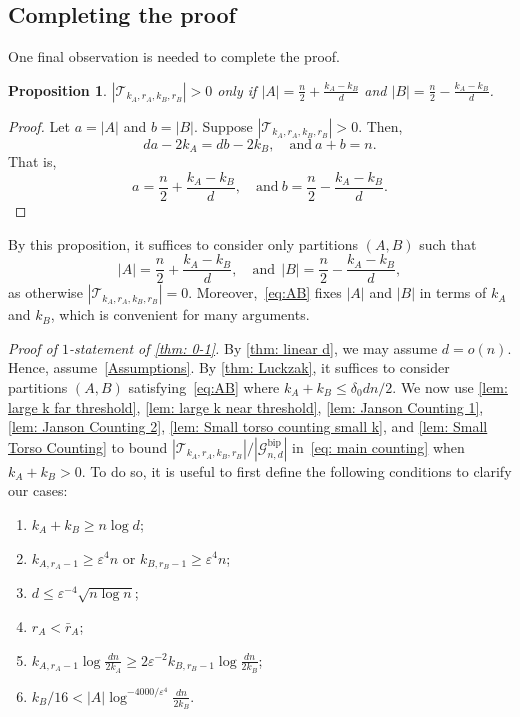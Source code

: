 \documentclass[11pt]{article}
\newcommand{\eps}{\varepsilon}
\theoremstyle{plain}
\newtheorem{prop}[thm]{Proposition}
\begin{document}
\subsection{Completing the proof}
One final observation is needed to complete the proof. 
\begin{prop}\label{prop: ab}
    $|\mathcal T_{k_A, r_A, k_B, r_B}| > 0$ only if $|A| = \frac{n}{2} + \frac{k_A-k_B}{d}$ and $|B| = \frac{n}{2} - \frac{k_A - k_B}{d}$.
\end{prop}
\begin{proof}
    Let $a=|A|$ and $b=|B|$.
    Suppose $|\mathcal T_{k_A, r_A, k_B, r_B}| > 0$. Then, 
    \[
        da - 2k_A = db - 2k_B,\quad \text{and}\         a + b = n.
    \]
    That is, 
    \[
    a = \frac{n}{2} + \frac{k_A - k_B}{d},\quad \text{and}\     b = \frac{n}{2} - \frac{k_A-k_B}{d}.
    \]
\end{proof}

By this proposition, it suffices to consider only partitions $(A,B)$ such that 
\begin{equation}
|A| = \frac{n}{2} + \frac{k_A-k_B}{d},\quad \text{and}\ \  |B| = \frac{n}{2} - \frac{k_A - k_B}{d},\label{eq:AB}
\end{equation}
as otherwise $|\mathcal T_{k_A, r_A, k_B, r_B}| = 0$.  Moreover,~\eqref{eq:AB} fixes $|A|$ and $|B|$ in terms of $k_A$ and $k_B$, which is convenient for many arguments. 

\medskip

\noindent \textit{Proof of $1$-statement of \cref{thm: 0-1}.} By \cref{thm: linear d}, we may assume $d = o(n)$. Hence, assume~\eqref{Assumptions}. By \cref{thm: Luckzak}, it suffices to consider partitions $(A,B)$ satisfying~\eqref{eq:AB} where $k_A + k_B \leq \delta_0dn/2$. We now use \cref{lem: large k far threshold}, \cref{lem: large k near threshold}, \cref{lem: Janson Counting 1}, \cref{lem: Janson Counting 2}, \cref{lem: Small torso counting small k}, and \cref{lem: Small Torso Counting} to bound $|\mathcal T_{k_A, r_A, k_B, r_B}|/|\mathcal G_{n,d}^{\text{bip}}|$ in~\eqref{eq: main counting} when $k_A + k_B > 0$. 
To do so, it is useful to first define the following conditions to clarify our cases:
\begin{enumerate}
    \item[(A)] $k_A + k_B \geq n\log d$;
    \item[(B)] $k_{A, r_A - 1} \geq \eps^4 n$ or $k_{B, r_B -1} \geq \eps^4 n$;
    \item[(C)] $d \leq \eps^{-4}\sqrt{n \log n}$;
    \item[(D)] $r_A < \bar r_A$;
    \item[(E)] $k_{A, r_A - 1}\log\frac{dn}{2k_A} \geq 2\eps^{-2}k_{B, r_B - 1}\log\frac{dn}{2k_B}$;
    \item[(F)] $k_B/16 < |A|\log^{-4000/\eps^4}\frac{dn}{2k_B}$.
\end{enumerate}
\end{document}
